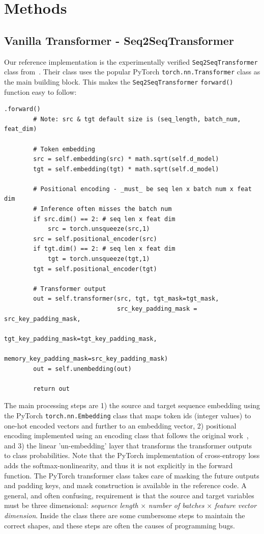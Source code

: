 \documentclass[final]{article}
\begin{document}
\section{Methods}

%
%
\subsection{Vanilla Transformer - Seq2SeqTransformer}
Our reference implementation is the experimentally verified \texttt{Seq2SeqTransformer} class
from~\cite{Kamarainen-2025-transintro}. Their class uses the popular PyTorch
\texttt{torch.nn.Transformer} class as the main building block. This makes the \texttt{Seq2SeqTransformer}
\texttt{forward()} function easy to follow:
\begin{lstlisting}
.forward()
        # Note: src & tgt default size is (seq_length, batch_num, feat_dim)

        # Token embedding
        src = self.embedding(src) * math.sqrt(self.d_model)
        tgt = self.embedding(tgt) * math.sqrt(self.d_model)

        # Positional encoding - _must_ be seq len x batch num x feat dim
        # Inference often misses the batch num
        if src.dim() == 2: # seq len x feat dim
            src = torch.unsqueeze(src,1) 
        src = self.positional_encoder(src)
        if tgt.dim() == 2: # seq len x feat dim
            tgt = torch.unsqueeze(tgt,1) 
        tgt = self.positional_encoder(tgt)

        # Transformer output
        out = self.transformer(src, tgt, tgt_mask=tgt_mask,
                               src_key_padding_mask = src_key_padding_mask,
                               tgt_key_padding_mask=tgt_key_padding_mask,
                               memory_key_padding_mask=src_key_padding_mask)
        out = self.unembedding(out)
        
        return out

\end{lstlisting}

The main processing steps are 1) the source and target sequence embedding using the PyTorch \texttt{torch.nn.Embedding} class that maps token ids (integer values) to one-hot encoded vectors and further to an embedding vector,
2) positional encoding implemented using an encoding class that follows the original work~\cite{transformer},
and 3) the linear 'un-embedding' layer that transforms the transformer outputs to class probabilities. Note that the PyTorch implementation of cross-entropy loss adds the softmax-nonlinearity, and thus it is not explicitly in the forward function. The PyTorch transformer class takes care of masking the future outputs and padding keys, and mask construction is available in the reference code. A general, and often confusing, requirement is that the source and target variables must be three dimensional:
\textit{sequence length} $\times$
\textit{number of batches} $\times$
\textit{feature vector dimension}.
Inside the class there are some cumbersome steps to maintain the correct shapes, and these steps are often the causes of programming bugs.
\end{document}
